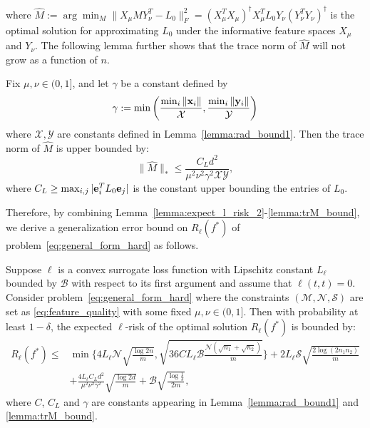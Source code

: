 \documentclass[twoside,11pt]{article}
\def\be{{\bf e}}
\def\bx{{\bf x}}
\def\by{{\bf y}}
\newcommand\rank[1]{{\operatorname{rank}}(#1)}
\def\bmax{{\mathcal B}}
\def\mmax{{\mathcal M}}
\def\nmax{{\mathcal N}}
\def\smax{{\mathcal S}}
\def\xmax{{\mathcal X}}
\def\ymax{{\mathcal Y}}
\def\wM{\hat{M}}
\def\realL{L_0}
\def\realS{S_0}
\begin{document}
where $\wM := \arg\min_M \|X_{\mu}MY_{\nu}^T-\realL\|^2_F = (X_{\mu}^TX_\mu)^{\dagger}X_\mu^T \realL Y_\nu(Y_\nu^TY_\nu)^{\dagger}$
is the optimal solution for approximating $\realL$ under the
informative feature spaces $X_\mu$ and $Y_\nu$.
The following lemma further shows that the trace norm of $\wM$ will not grow
as a function of $n$.
\begin{lemma}
Fix $\mu, \nu \in (0, 1]$, and %
let $\gamma$ be a constant defined by
\begin{equation*}
  \gamma := \min\bigg(\frac{\min_i\|\bx_i\|}{\xmax},
  \frac{\min_i\|\by_i\|}{\ymax}\bigg)
\end{equation*}
where $\xmax, \ymax$ are constants defined in Lemma~\ref{lemma:rad_bound1}.
Then the trace norm of $\hat{M}$ is upper bounded by:
  \begin{equation*}
    \|\hat{M}\|_* \leq
    \frac{C_Ld^2}{\mu^2\nu^2\gamma^2\xmax\ymax},
  \end{equation*}
  \label{lemma:trM_bound}
  where $C_L \geq \max_{i,j}|\be_i^T\realL\be_j|$ is the constant upper bounding the entries
  of $\realL$.
\end{lemma}
Therefore, by combining Lemma~\ref{lemma:expect_l_risk_2}-\ref{lemma:trM_bound},
we derive a generalization error bound on $R_\ell(f^*)$ of problem~\eqref{eq:general_form_hard}
as follows.
\begin{theorem} %
  \label{thm:gen_bound}
  Suppose $\ell$ is a convex surrogate loss function with Lipschitz constant $L_\ell$ bounded
  by $\bmax$ with respect to its first argument and
  assume that $\ell(t, t) = 0$.
  Consider problem~\eqref{eq:general_form_hard} where the constraints $(\mmax, \nmax, \smax)$
  are set as \eqref{eq:feature_quality} with some fixed $\mu, \nu \in (0, 1]$.
  Then with probability at least $1-\delta$, the expected $\ell$-risk of the
  optimal solution $R_\ell(f^*)$ is bounded by:
  \begin{align*}
    R_\ell(f^*)
    \leq
    &\min\bigg\{4L_\ell\nmax\sqrt{\frac{\log{2n}}{m}}, \sqrt{36CL_\ell\bmax\frac{\nmax(\sqrt{n_1}+\sqrt{n_2})}{m}}\bigg\}
    + 2L_\ell\smax\sqrt{\frac{2\log{(2n_1n_2)}}{m}}\\
    &+ \frac{4L_\ell C_Ld^2}{\mu^2\nu^2\gamma^2} \sqrt{\frac{\log{2d}}{m}}
    + \bmax\sqrt{\frac{\log \frac{1}{\delta}}{2m}},
  \end{align*}
  where $C$, $C_L$ and $\gamma$ are constants appearing in Lemma~\ref{lemma:rad_bound1} and \ref{lemma:trM_bound}.
\end{theorem}
\end{document}
